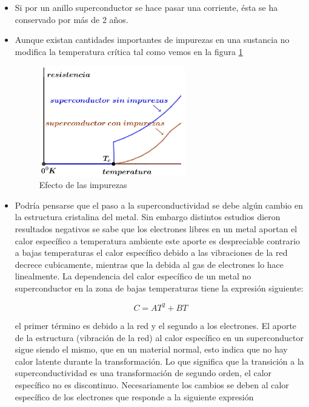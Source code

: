 \begin{itemize}
	\item Si por un anillo superconductor se hace pasar una corriente, ésta se ha conservado por más de 2 años.
	
	\item Aunque existan cantidades importantes de impurezas en una sustancia no modifica la temperatura crítica tal como vemos en la figura \ref{fig:49}
	
	
\begin{figure}[H]
    \centering
    \includegraphics[width=0.6\textwidth]{./Figures/fig49}
	\caption{Efecto de las impurezas}
	\label{fig:49}
\end{figure}
	
	
	
	\item Podría pensarse que el paso a la superconductividad se debe algún cambio en la estructura cristalina del metal. Sin embargo distintos estudios dieron resultados negativos se sabe que los electrones libres en un metal aportan el calor específico a temperatura ambiente este aporte es despreciable contrario a bajas temperaturas el calor específico debido a las
vibraciones de la red decrece cubicamente, mientras que la debida al gas de electrones lo hace linealmente. La dependencia del calor específico de un metal no superconductor en la zona de bajas temperaturas tiene la expresión siguiente:

\begin{equation}
	C= AT^{2}+BT
\end{equation}

el primer término es debido a la red y el segundo a los electrones. El aporte de la estructura (vibración de la red) al calor específico en un superconductor sigue siendo el mismo, que en un material normal, esto indica que no hay calor latente durante la transformación. Lo que significa que la transición a la superconductividad es una transformación de segundo orden, el calor específico no es discontinuo. Necesariamente los cambios se deben al calor específico de los electrones que responde a la siguiente expresión


\end{itemize}
